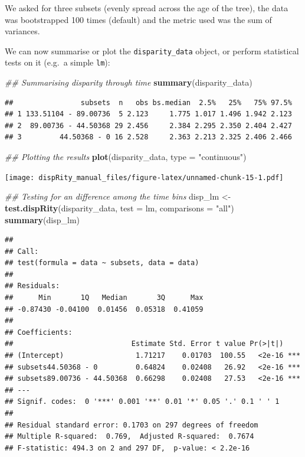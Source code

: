 \documentclass[]{book}
\newenvironment{Shaded}{\begin{snugshade}}{\end{snugshade}}
\newcommand{\CommentTok}[1]{\textcolor[rgb]{0.56,0.35,0.01}{\textit{#1}}}
\newcommand{\DataTypeTok}[1]{\textcolor[rgb]{0.13,0.29,0.53}{#1}}
\newcommand{\KeywordTok}[1]{\textcolor[rgb]{0.13,0.29,0.53}{\textbf{#1}}}
\newcommand{\NormalTok}[1]{#1}
\newcommand{\StringTok}[1]{\textcolor[rgb]{0.31,0.60,0.02}{#1}}
\begin{document}
We asked for three subsets (evenly spread across the age of the tree), the data was bootstrapped 100 times (default) and the metric used was the sum of variances.

We can now summarise or plot the \texttt{disparity\_data} object, or perform statistical tests on it (e.g.~a simple \texttt{lm}):

\begin{Shaded}
\begin{Highlighting}[]
\CommentTok{## Summarising disparity through time}
\KeywordTok{summary}\NormalTok{(disparity_data)}
\end{Highlighting}
\end{Shaded}

\begin{verbatim}
##                subsets  n   obs bs.median  2.5%   25%   75% 97.5%
## 1 133.51104 - 89.00736  5 2.123     1.775 1.017 1.496 1.942 2.123
## 2  89.00736 - 44.50368 29 2.456     2.384 2.295 2.350 2.404 2.427
## 3         44.50368 - 0 16 2.528     2.363 2.213 2.325 2.406 2.466
\end{verbatim}

\begin{Shaded}
\begin{Highlighting}[]
\CommentTok{## Plotting the results}
\KeywordTok{plot}\NormalTok{(disparity_data, }\DataTypeTok{type =} \StringTok{"continuous"}\NormalTok{)}
\end{Highlighting}
\end{Shaded}

\texttt{[image: dispRity\_manual\_files/figure-latex/unnamed-chunk-15-1.pdf]}

\begin{Shaded}
\begin{Highlighting}[]
\CommentTok{## Testing for an difference among the time bins}
\NormalTok{disp_lm <-}\StringTok{ }\KeywordTok{test.dispRity}\NormalTok{(disparity_data, }\DataTypeTok{test =}\NormalTok{ lm,}
                         \DataTypeTok{comparisons =} \StringTok{"all"}\NormalTok{)}
\KeywordTok{summary}\NormalTok{(disp_lm)}
\end{Highlighting}
\end{Shaded}

\begin{verbatim}
## 
## Call:
## test(formula = data ~ subsets, data = data)
## 
## Residuals:
##      Min       1Q   Median       3Q      Max 
## -0.87430 -0.04100  0.01456  0.05318  0.41059 
## 
## Coefficients:
##                            Estimate Std. Error t value Pr(>|t|)    
## (Intercept)                 1.71217    0.01703  100.55   <2e-16 ***
## subsets44.50368 - 0         0.64824    0.02408   26.92   <2e-16 ***
## subsets89.00736 - 44.50368  0.66298    0.02408   27.53   <2e-16 ***
## ---
## Signif. codes:  0 '***' 0.001 '**' 0.01 '*' 0.05 '.' 0.1 ' ' 1
## 
## Residual standard error: 0.1703 on 297 degrees of freedom
## Multiple R-squared:  0.769,  Adjusted R-squared:  0.7674 
## F-statistic: 494.3 on 2 and 297 DF,  p-value: < 2.2e-16
\end{verbatim}
\end{document}
